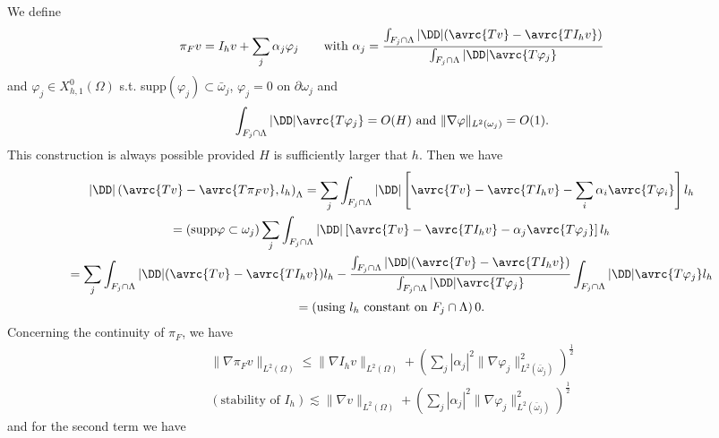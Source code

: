 We define
\begin{equation*}
\pi_F v = I_h v + \sum _j \alpha _j \varphi _j \qquad \text{with }\alpha_j =\frac{\int_{F_j \cap \Lambda}|\DD| (\avrc{Tv}-\avrc{TI_hv})}{\int_{F_j \cap \Lambda}|\DD|\avrc{T\varphi _j}}
\end{equation*}
and $\varphi_j \in X_{h,1}^0(\Omega)$ s.t. supp$(\varphi_j)\subset \bar{\omega}_j$, $\varphi_j =0$ on $\partial \omega _j$ and 
\begin{equation*}
 \int_{F_j\cap \Lambda}|\DD|\avrc{T\varphi_j}=O(H) \text{ and } \|\nabla \varphi\|_{L^2(\omega _j)}=O(1). 
\end{equation*}
This construction is always possible provided $H$ is sufficiently larger that $h$.
Then we have
\begin{multline*}
|\DD|\left(\avrc{T v} - \avrc{T \pi _F v}  , l _h\right)_{\Lambda} 
= \sum _j \int_{F_j\cap \Lambda} |\DD |\left[ \avrc{Tv}-\avrc{TI_hv}-\sum _i \alpha_i \avrc{T\varphi _i} \right]l_h \\
=(\text{supp} \varphi \subset \omega_j) \sum _j \int_{F_j\cap \Lambda}|\DD| \left[ \avrc{Tv}-\avrc{TI_hv}-\alpha_j \avrc{T\varphi _j} \right]l_h\\
=\sum _j \int_{F_j\cap \Lambda} |\DD| (\avrc{Tv}-\avrc{T I_h v}) l_h - \frac{\int_{F_j\cap \Lambda} |\DD| (\avrc{Tv}-\avrc{TI_hv})}{\int_{F_j\cap \Lambda}|\DD|\avrc{T\varphi_j}} \int_{F_j\cap \Lambda} |\DD|\avrc{T\varphi _j}l_h\\ 
=(\text{using $l_h$ constant on $F_j\cap \Lambda$})\,0.
\end{multline*}
Concerning the continuity of $\pi_F$, we have
\begin{multline*}
\|\nabla \pi_F v \|_{L^2(\Omega)} \leq \|\nabla I_h v\|_{L^2(\Omega)} + \left(\sum_j|\alpha_j|^2\|\nabla \varphi _j\|^2_{L^2(\bar{\omega}_j)}\right)^{\frac 12}\\
(\text{stability of }I_h)\lesssim   \|\nabla  v\|_{L^2(\Omega)} + \left(\sum_j|\alpha_j|^2\|\nabla \varphi _j\|^2_{L^2(\bar{\omega}_j)}\right)^{\frac 12}
\end{multline*}
and for the second term we have
